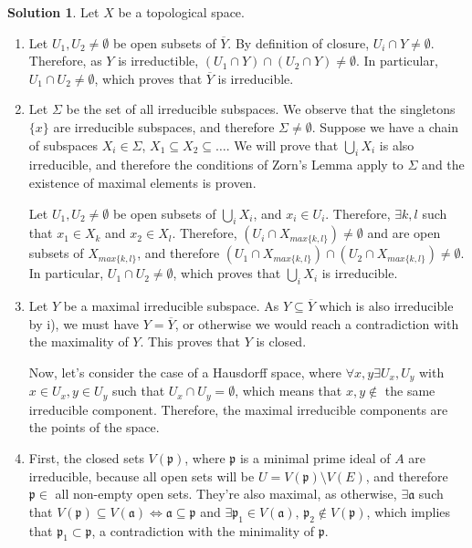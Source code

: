 \documentclass[12pt]{article}
\newcommand{\ip}{\ensuremath{\mathfrak{p}}}
\newcommand{\ia}{\ensuremath{\mathfrak{a}}}
\newcommand*\closure[1]{\overline{#1}}
\theoremstyle{definition}
\newtheorem*{sol}{Solution}
\begin{document}
\begin{sol}
	Let $X$ be a topological space.
	\begin{enumerate}[label=(\roman*)]
		\item Let $U_1, U_2 \neq \emptyset$ be open subsets of $\closure{Y}$. By definition of closure, $U_i \cap Y \neq \emptyset$. Therefore, as $Y$ is irreductible, $(U_1 \cap Y) \cap (U_2 \cap Y) \neq \emptyset$. In particular, $U_1 \cap U_2 \neq \emptyset$, which proves that $\closure{Y}$ is irreducible.

		\item Let $\Sigma$ be the set of all irreducible subspaces. We observe that the singletons $\{x\}$ are irreducible subspaces, and therefore $\Sigma \neq \emptyset$. Suppose we have a chain of subspaces $X_i \in \Sigma$, $X_1 \subseteq X_2 \subseteq \dots$. We will prove that $\bigcup_{i} X_i$ is also irreducible, and therefore the conditions of Zorn's Lemma apply to $\Sigma$ and the existence of maximal elements is proven.

		Let $U_1, U_2 \neq \emptyset$ be open subsets of $\bigcup_{i} X_i$, and $x_i \in U_i$. Therefore, $\exists k,l$ such that $x_1 \in X_{k}$ and $x_2 \in X_{l}$. Therefore, $(U_i \cap X_{max\{k,l\}}) \neq \emptyset$ and are open subsets of $X_{max\{k,l\}}$, and therefore $(U_1 \cap X_{max\{k,l\}}) \cap (U_2 \cap X_{max\{k,l\}}) \neq \emptyset$. In particular, $U_1 \cap U_2 \neq \emptyset$, which proves that $\bigcup_{i} X_i$ is irreducible.

		\item Let $Y$ be a maximal irreducible subspace. As $Y \subseteq \closure{Y}$ which is also irreducible by i), we must have $Y = \closure{Y}$, or otherwise we would reach a contradiction with the maximality of $Y$. This proves that $Y$ is closed.

		Now, let's consider the case of a Hausdorff space, where $\forall x,y \exists U_x, U_y$ with $x \in U_x, y \in U_y$ such that $U_x \cap U_y = \emptyset$, which means that $x,y \notin$ the same irreducible component. Therefore, the maximal irreducible components are the points of the space.

		\item First, the closed sets $V(\ip)$, where $\ip$ is a minimal prime ideal of $A$ are irreducible, because all open sets will be $U = V(\ip) \setminus V(E)$, and therefore $\ip \in$ all non-empty open sets. They're also maximal, as otherwise, $ \exists \ia$ such that $V(\ip) \subseteq V(\ia) \iff \ia \subseteq \ip$ and $\exists \ip_1 \in V(\ia), \, \ip_2 \notin V(\ip)$, which implies that $\ip_1 \subset \ip$, a contradiction with the minimality of $\ip$.


\end{enumerate}
\end{sol}
\end{document}
